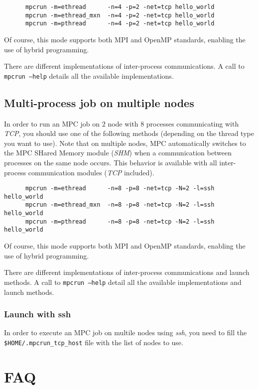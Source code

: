 \documentclass[a4paper,11pt]{article}
\begin{document}
\begin{verbatim}
      mpcrun -m=ethread      -n=4 -p=2 -net=tcp hello_world
      mpcrun -m=ethread_mxn  -n=4 -p=2 -net=tcp hello_world
      mpcrun -m=pthread      -n=4 -p=2 -net=tcp hello_world
\end{verbatim}

Of course, this mode supports both MPI and OpenMP standards, enabling the use of hybrid programming.

There are different implementations of inter-process communications.
A call to {\tt mpcrun --help} details all the available implementations.

\subsection{Multi-process job on multiple nodes}
In order to run an MPC job on $2$ node with $8$ processes communicating with \emph{TCP}, you should use one of the following methods (depending on the thread type you want to use). Note that on multiple nodes, MPC automatically switches to the MPC SHared Memory module (\emph{SHM}) when a communication between processes on the same node occurs. This behavior is available with all inter-process communication modules (\emph{TCP} included).

\begin{verbatim}
      mpcrun -m=ethread      -n=8 -p=8 -net=tcp -N=2 -l=ssh hello_world
      mpcrun -m=ethread_mxn  -n=8 -p=8 -net=tcp -N=2 -l=ssh hello_world
      mpcrun -m=pthread      -n=8 -p=8 -net=tcp -N=2 -l=ssh hello_world
\end{verbatim}

Of course, this mode supports both MPI and OpenMP standards, enabling the use of hybrid programming.

There are different implementations of inter-process communications and launch methods.
A call to {\tt mpcrun --help} detail all the available implementations and launch methods.

\subsubsection{Launch with ssh}
In order to execute an MPC job on multile nodes using \emph{ssh}, you need to fill the {\tt \${HOME}/.mpcrun\_tcp\_host} file with the list of nodes to use.

\section{FAQ}
\label{sec:faq}
\end{document}
